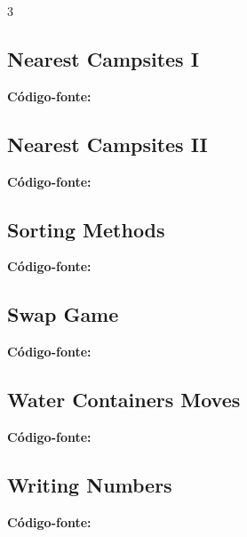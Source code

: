 \documentclass[8pt]{extarticle}
\begin{document}
\begin{multicols*}{3}
\subsection{Nearest Campsites I}
\begin{caixaenunciado}

\end{caixaenunciado}
\vspace{0.3cm}
\noindent\textbf{Código-fonte:}


\subsection{Nearest Campsites II}
\begin{caixaenunciado}

\end{caixaenunciado}
\vspace{0.3cm}
\noindent\textbf{Código-fonte:}


\subsection{Sorting Methods}
\begin{caixaenunciado}

\end{caixaenunciado}
\vspace{0.3cm}
\noindent\textbf{Código-fonte:}


\subsection{Swap Game}
\begin{caixaenunciado}

\end{caixaenunciado}
\vspace{0.3cm}
\noindent\textbf{Código-fonte:}


\subsection{Water Containers Moves}
\begin{caixaenunciado}

\end{caixaenunciado}
\vspace{0.3cm}
\noindent\textbf{Código-fonte:}


\subsection{Writing Numbers}
\begin{caixaenunciado}

\end{caixaenunciado}
\vspace{0.3cm}
\noindent\textbf{Código-fonte:}

\end{multicols*}
\end{document}
